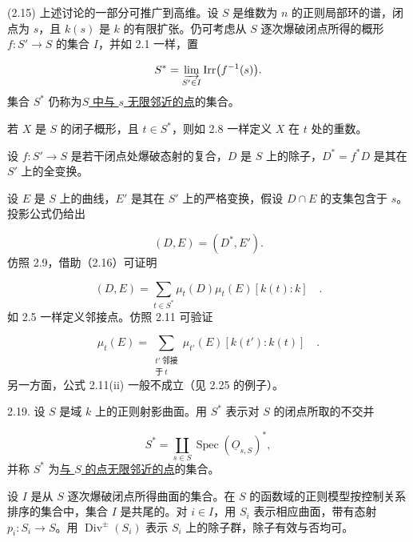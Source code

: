 \par
(2.15) 上述讨论的一部分可推广到高维。设 $S$ 是维数为 $n$ 的正则局部环的谱，闭点为 $s$，且 $k(s)$ 是 $k$ 的有限扩张。仍可考虑从 $S$ 逐次爆破闭点所得的概形 $f:S'\longrightarrow S$ 的集合 $I$，并如 2.1 一样，置

\begin{equation*}
S^*=\varinjlim_{S'\in I}\operatorname{Irr}\bigl(f^{-1}(s)\bigr).
\end{equation*}
集合 $S^*$ 仍称为\underline{$S$ 中与 $s$ 无限邻近的点}的集合。

若 $X$ 是 $S$ 的闭子概形，且 $t\in S^*$，则如 2.8 一样定义 $X$ 在 $t$ 处的重数。

设 $f:S'\longrightarrow S$ 是若干闭点处爆破态射的复合，$D$ 是 $S$ 上的除子，$D^*=f^*D$ 是其在 $S'$ 上的全变换。


设 $E$ 是 $S$ 上的曲线，$E'$ 是其在 $S'$ 上的严格变换，假设 $D\cap E$ 的支集包含于 $s$。投影公式仍给出

\begin{equation}\tag{2.16}
(D,E)=(D^*,E').
\end{equation}
仿照 2.9，借助（2.16）可证明

\begin{equation}\tag{2.17}
(D,E)=\sum_{t\in S^*}\mu_t(D)\mu_t(E)[k(t):k] \quad .
\end{equation}
如 2.5 一样定义邻接点。仿照 2.11 可验证

\begin{equation}\tag{2.18}
\mu_t(E)=
\sum_{\substack{t'\ \text{邻接}\\\text{于}\ t}}
\mu_{t'}(E)[k(t'):k(t)] \quad .
\end{equation}
另一方面，公式 2.11(ii) 一般不成立（见 2.25 的例子）。

2.19. 设 $S$ 是域 $k$ 上的正则射影曲面。用 $S^*$ 表示对 $S$ 的闭点所取的不交并

\begin{equation*}
S^*=\coprod_{s\in S}\operatorname{Spec}(\underline{O}_{s,S})^*,
\end{equation*}
并称 $S^*$ 为\underline{与 $S$ 的点无限邻近的点}的集合。

设 $I$ 是从 $S$ 逐次爆破闭点所得曲面的集合。在 $S$ 的函数域的正则模型按控制关系排序的集合中，集合 $I$ 是共尾的。对 $i\in I$，用 $S_i$ 表示相应曲面，带有态射 $p_i:S_i\longrightarrow S$。用 $\operatorname{Div}^{\pm}(S_i)$ 表示 $S_i$ 上的除子群，除子有效与否均可。

